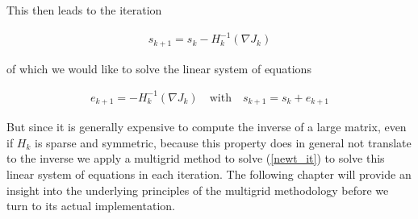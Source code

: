 \documentclass[../draft_1.tex]{subfiles}
\begin{document}
This then leads to the iteration
\begin{ceqn}
	\begin{align}	
	s_{k+1} = s_k - H_k^{-1}(\nabla J_k)
	\end{align}
\end{ceqn}
of which we would like to solve the linear system of equations 
\begin{ceqn}
	\begin{align}	
	\label{newt_it}
	e_{k+1} = - H_k^{-1}(\nabla J_k) \quad \text{with} \quad
	s_{k+1} =  s_k + e_{k+1}
	\end{align}
\end{ceqn}
But since it is generally expensive to compute the inverse of a large matrix, even if $H_k$ is sparse and symmetric, because this property does in general not translate to the inverse we apply a multigrid method to solve (\ref{newt_it}) to solve this linear system of equations in each iteration. The following chapter will provide an insight into the underlying principles of the multigrid methodology before we turn to its actual implementation.
\end{document}
